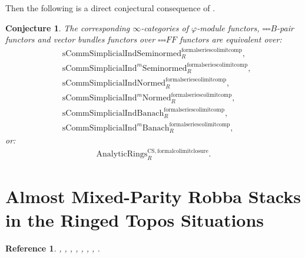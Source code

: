 \documentclass[12pt]{book}
\newtheorem{reference}{Reference}
\newtheorem{conjecture}{Conjecture}
\begin{document}
Then the following is a direct conjectural consequence of  \cite[Theorem 9.3.12]{KL1}.

\begin{conjecture}
The corresponding $\infty$-categories of $\varphi$-module functors, ${\square\square\square}B$-pair functors and vector bundles functors over ${\square\square\square}FF$ functors are equivalent over:
\begin{align}
&\mathrm{sComm}\mathrm{Simplicial}\mathrm{Ind}\mathrm{Seminormed}^\mathrm{formalseriescolimitcomp}_R,\\
&\mathrm{sComm}\mathrm{Simplicial}\mathrm{Ind}^m\mathrm{Seminormed}^\mathrm{formalseriescolimitcomp}_R,\\
&\mathrm{sComm}\mathrm{Simplicial}\mathrm{Ind}\mathrm{Normed}^\mathrm{formalseriescolimitcomp}_R,\\
&\mathrm{sComm}\mathrm{Simplicial}\mathrm{Ind}^m\mathrm{Normed}^\mathrm{formalseriescolimitcomp}_R,\\
&\mathrm{sComm}\mathrm{Simplicial}\mathrm{Ind}\mathrm{Banach}^\mathrm{formalseriescolimitcomp}_R,\\
&\mathrm{sComm}\mathrm{Simplicial}\mathrm{Ind}^m\mathrm{Banach}^\mathrm{formalseriescolimitcomp}_R,	
\end{align}
or:
\begin{align}
\mathrm{AnalyticRings}^\mathrm{CS,formalcolimitclosure}_R.	
\end{align}	
\end{conjecture}




\newpage
\section{Almost Mixed-Parity Robba Stacks in the Ringed Topos Situations}

\begin{reference}
\cite{KL1}, \cite{KL2}, \cite{Sch1}, \cite{Sch}, \cite{Fon}, \cite{FF}, \cite{F1}, \cite{Ta}.
\end{reference}
\end{document}
